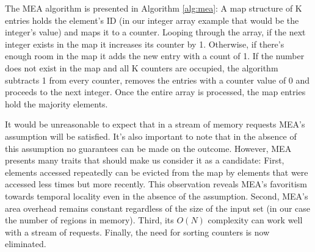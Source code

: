 
The MEA algorithm is presented in Algorithm \ref{alg:mea}: A map structure of K entries holds the element's ID (in our integer array example that would be the integer's value) and maps it to a counter. Looping through the array, if the next integer exists in the map it increases its counter by 1. Otherwise, if there's enough room in the map it adds the new entry with a count of 1. If the number does not exist in the map and all K counters are occupied, the algorithm subtracts 1 from every counter, removes the entries with a counter value of 0 and proceeds to the next integer. Once the entire array is processed, the map entries hold the majority elements. 


It would be unreasonable to expect that in a stream of memory requests MEA's assumption will be satisfied. It's also important to note that in the absence of this assumption no guarantees can be made on the outcome. However, MEA presents many traits that should make us consider it as a candidate: First, elements accessed repeatedly can be evicted from the map by elements that were accessed less times but more recently. This observation reveals MEA's favoritism towards temporal locality even in the absence of the assumption. Second, MEA's area overhead remains constant regardless of the size of the input set (in our case the number of regions in memory). Third, its $O(N)$ complexity can work well with a stream of requests. Finally, the need for sorting counters is now eliminated.


